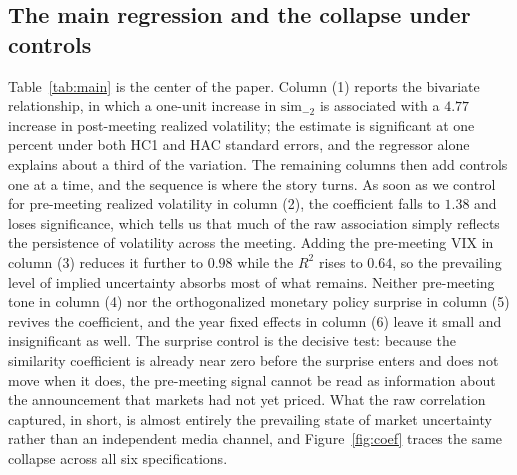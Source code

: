 \documentclass[11pt,a4paper]{article}
\newcommand{\simk}[1]{\ensuremath{\mathrm{sim}_{#1}}}
\begin{document}
\begin{table}[t]
\centering
\caption{Lead--lag correlations around the meeting, broad corpus.}
\label{tab:leadlag}
\small

\vspace{2pt}
\caption*{\footnotesize Stars denote $p<0.10$ ($*$), $p<0.05$ ($**$),
$p<0.01$ ($***$). $n=33$ meetings (2015--2019).}
\end{table}

\subsection{The main regression and the collapse under controls}

Table~\ref{tab:main} is the center of the paper. Column (1) reports the bivariate
relationship, in which a one-unit increase in \simk{-2} is associated with a $4.77$
increase in post-meeting realized volatility; the estimate is significant at one
percent under both HC1 and HAC standard errors, and the regressor alone explains
about a third of the variation. The remaining columns then add controls one at a
time, and the sequence is where the story turns. As soon as we control for
pre-meeting realized volatility in column (2), the coefficient falls to $1.38$ and
loses significance, which tells us that much of the raw association simply reflects
the persistence of volatility across the meeting. Adding the pre-meeting VIX in
column (3) reduces it further to $0.98$ while the $R^2$ rises to $0.64$, so the
prevailing level of implied uncertainty absorbs most of what remains. Neither
pre-meeting tone in column (4) nor the orthogonalized monetary policy surprise in
column (5) revives the coefficient, and the year fixed effects in column (6) leave
it small and insignificant as well. The surprise control is the decisive test:
because the similarity coefficient is already near zero before the surprise enters
and does not move when it does, the pre-meeting signal cannot be read as
information about the announcement that markets had not yet priced. What the raw
correlation captured, in short, is almost entirely the prevailing state of market
uncertainty rather than an independent media channel, and Figure~\ref{fig:coef}
traces the same collapse across all six specifications.

\begin{table}[t]
\centering
\caption{Pre-meeting similarity and post-meeting volatility, broad corpus.}
\label{tab:main}
\small

\vspace{2pt}
\caption*{\footnotesize Dependent variable: post-meeting realized volatility.
Column (5) adds the orthogonalized Bauer--Swanson monetary policy surprise. HC1 and
Newey--West (HAC, two lags) standard errors in parentheses. Stars denote
$p<0.10$ ($*$), $p<0.05$ ($**$), $p<0.01$ ($***$). $n=33$.}
\end{table}
\end{document}
